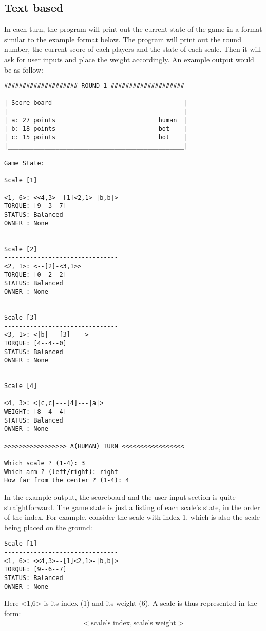 \documentclass[12pt]{article}
\begin{document}
\subsection{Text based}
In each turn, the program will print out the current state of the game in a
format similar to the example format below. The program will print out the round
number, the current score of each players and the state of each scale. Then it
will ask for user inputs and place the weight accordingly. An example output
would be as follow:
\begin{verbatim}
#################### ROUND 1 ####################
__________________________________________________
| Score board                                    |
|________________________________________________|
| a: 27 points                            human  |
| b: 18 points                            bot    |
| c: 15 points                            bot    |
|________________________________________________|

Game State:

Scale [1]
-------------------------------
<1, 6>: <<4,3>--[1]<2,1>-|b,b|> 
TORQUE: [9--3--7] 
STATUS: Balanced
OWNER : None


Scale [2]
-------------------------------
<2, 1>: <--[2]-<3,1>> 
TORQUE: [0--2--2] 
STATUS: Balanced
OWNER : None


Scale [3]
-------------------------------
<3, 1>: <|b|---[3]----> 
TORQUE: [4--4--0] 
STATUS: Balanced
OWNER : None


Scale [4]
-------------------------------
<4, 3>: <|c,c|---[4]---|a|> 
WEIGHT: [8--4--4] 
STATUS: Balanced
OWNER : None

>>>>>>>>>>>>>>>>> A(HUMAN) TURN <<<<<<<<<<<<<<<<<

Which scale ? (1-4): 3
Which arm ? (left/right): right
How far from the center ? (1-4): 4
\end{verbatim}

In the example output, the scoreboard and the user input section is quite
straightforward. The game state is just a listing of each scale's state, in the
order of the index. For example, consider the scale with index 1, which is also
the scale being placed on the ground:
\begin{verbatim}
Scale [1]
-------------------------------
<1, 6>: <<4,3>--[1]<2,1>-|b,b|> 
TORQUE: [9--6--7] 
STATUS: Balanced
OWNER : None
\end{verbatim}

Here <1,6> is its index (1) and its weight (6). A scale is thus represented in
the form:
\begin{align*}
  <\text{scale's index}, \text{scale's weight}>
\end{align*}
\end{document}

